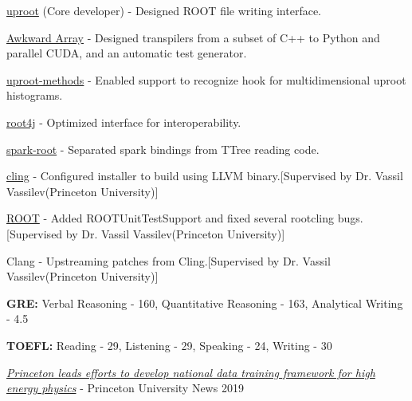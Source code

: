 \documentclass[10pt, letterpaper]{fulldeps}
\begin{document}
\begin{tightitemize}
\item {\href{https://github.com/scikit-hep/uproot}{uproot}} (Core developer) - Designed ROOT file writing interface.
\item {\href{https://github.com/scikit-hep/awkward-1.0}{Awkward Array}} - Designed transpilers from a subset of C++ to Python and parallel CUDA, and an automatic test generator.
\item {\href{https://github.com/scikit-hep/uproot-methods}{uproot-methods}} - Enabled support to recognize hook for multidimensional uproot histograms.
\item {\href{https://github.com/diana-hep/root4j}{root4j}} - Optimized interface for interoperability.
\item {\href{https://github.com/diana-hep/spark-root}{spark-root}} - Separated spark bindings from TTree reading code.
\item {\href{https://github.com/root-project/cling}{cling}} - Configured installer to build using LLVM binary.[Supervised by Dr. Vassil Vassilev(Princeton University)]
\item {\href{https://github.com/root-project/root}{ROOT}} - Added ROOTUnitTestSupport and fixed several rootcling bugs.[Supervised by Dr. Vassil Vassilev(Princeton University)]
\item {Clang} - Upstreaming patches from Cling.[Supervised by Dr. Vassil Vassilev(Princeton University)]
\end{tightitemize}

\begin{tightitemize}
\item \textbf{GRE:} Verbal Reasoning - 160, Quantitative Reasoning - 163, Analytical Writing - 4.5
\item \textbf{TOEFL:} Reading - 29, Listening - 29, Speaking - 24, Writing - 30
\end{tightitemize}

\begin{tightitemize}
\item \textit{\href{https://www.princeton.edu/news/2019/08/19/princeton-leads-efforts-develop-national-data-training-framework-high-energy}{Princeton leads efforts to develop national data training framework for high energy physics}} - Princeton University News \hfill{2019}
\end{tightitemize}
\end{document}
